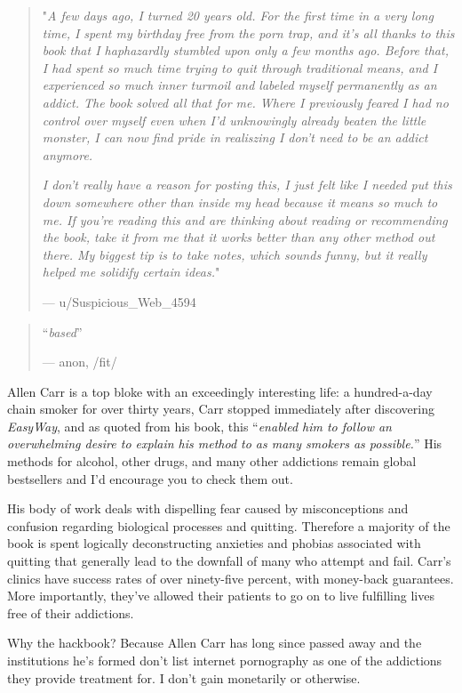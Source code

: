 \documentclass[
]{book}
\begin{document}
\begin{quote}
"\emph{A few days ago, I turned 20 years old. For the first time in a very long time, I spent my birthday free from the porn trap, and it's all thanks to this book that I haphazardly stumbled upon only a few months ago. Before that, I had spent so much time trying to quit through traditional means, and I experienced so much inner turmoil and labeled myself permanently as an addict. The book solved all that for me. Where I previously feared I had no control over myself even when I'd unknowingly already beaten the little monster, I can now find pride in realiszing I don't need to be an addict anymore.}

\emph{I don't really have a reason for posting this, I just felt like I needed put this down somewhere other than inside my head because it means so much to me. If you're reading this and are thinking about reading or recommending the book, take it from me that it works better than any other method out there. My biggest tip is to take notes, which sounds funny, but it really helped me solidify certain ideas.}"

--- u/Suspicious\_Web\_4594
\end{quote}

\begin{quote}
``\emph{based}''

--- anon, /fit/
\end{quote}

Allen Carr is a top bloke with an exceedingly interesting life: a hundred-a-day chain smoker for over thirty years, Carr stopped immediately after discovering \emph{EasyWay}, and as quoted from his book, this ``\emph{enabled him to follow an overwhelming desire to explain his method to as many smokers as possible.}'' His methods for alcohol, other drugs, and many other addictions remain global bestsellers and I'd encourage you to check them out.

His body of work deals with dispelling fear caused by misconceptions and confusion regarding biological processes and quitting. Therefore a majority of the book is spent logically deconstructing anxieties and phobias associated with quitting that generally lead to the downfall of many who attempt and fail. Carr's clinics have success rates of over ninety-five percent, with money-back guarantees. More importantly, they've allowed their patients to go on to live fulfilling lives free of their addictions.

Why the hackbook? Because Allen Carr has long since passed away and the institutions he's formed don't list internet pornography as one of the addictions they provide treatment for. I don't gain monetarily or otherwise.
\end{document}
